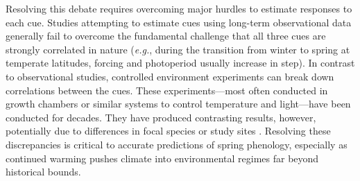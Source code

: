 \documentclass{article}
\begin{document}
\par Resolving this debate requires overcoming major hurdles to estimate responses to each cue. Studies attempting to estimate cues using long-term observational data \emph{\citep[e.g.,][]{zohner2016,vitasse2013}} generally fail to overcome the fundamental challenge that all three cues are strongly correlated in nature (\emph{e.g.}, during the transition from winter to spring at temperate latitudes, forcing and photoperiod usually increase in step). In contrast to observational studies, controlled environment experiments can break down correlations between the cues. These experiments---most often conducted in growth chambers or similar systems to control temperature and light---have been conducted for decades. They have produced contrasting results, however, potentially due to differences in focal species or study sites \emph{\citep{zohner2016,Caffarra:2011b,Laube:2014a,Basler:2012,Caffarra:2011a}}. Resolving these discrepancies is critical to accurate predictions of spring phenology, especially as continued warming pushes climate into environmental regimes far beyond historical bounds. 

\end{document}
